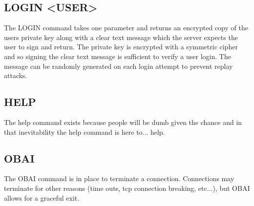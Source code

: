 \documentclass[a4paper,11pt]{article}
\begin{document}
\subsection{LOGIN <USER>}
The LOGIN command takes one parameter and returns an encrypted copy of the users private key along with a clear text message which the server expects the user to sign and return. The private key is encrypted with a symmetric cipher and so signing the clear text message is sufficient to verify a user login. The message can be randomly generated on each login attempt to prevent replay attacks.
\subsection{HELP}
The help command exists because people will be dumb given the chance and in that inevitability the help command is here to... help.
\subsection{OBAI}
The OBAI command is in place to terminate a connection. Connections may terminate for other reasons (time outs, tcp connection breaking, etc...), but OBAI allows for a graceful exit. 
\end{document}
